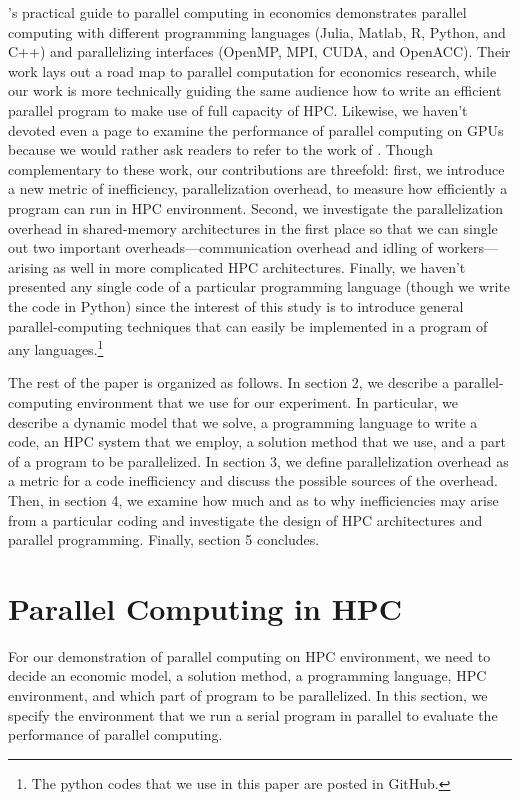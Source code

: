 \documentclass[12pt]{article}
\begin{document}
\cite{Fernandez-Villaverde-Valencia-18}'s practical guide to parallel computing in economics demonstrates parallel computing with different programming languages (Julia, Matlab, R, Python, and C++) and parallelizing interfaces (OpenMP, MPI, CUDA, and OpenACC). Their work lays out a road map to parallel computation for economics research, while our work is more technically guiding the same audience how to write an efficient parallel program to make use of full capacity of HPC. Likewise, we haven't devoted even a page to examine the performance of parallel computing on GPUs because we would rather ask readers to refer to the work of \cite{Aldrich-Fernandez-Villaverde-Gallant-Rubio-Ramirez-11}. Though complementary to these work, our contributions are threefold: first, we introduce a new metric of inefficiency, parallelization overhead, to measure how efficiently a program can run in HPC environment. Second, we investigate the parallelization overhead in shared-memory architectures in the first place so that we can single out two important overheads---communication overhead and idling of workers---arising as well in more complicated HPC architectures. Finally, we haven't presented any single code of a particular programming language (though we write the code in Python) since the interest of this study is to introduce general parallel-computing techniques that can easily be implemented in a program of any languages.\footnote{\sf The python codes that we use in this paper are posted in GitHub.}


The rest of the paper is organized as follows. In section 2, we describe a parallel-computing environment that we use for our experiment. In particular, we describe a dynamic model that we solve, a programming language to write a code, an HPC system that we employ, a solution method that we use, and a part of a program to be parallelized. In section 3, we define parallelization overhead as a metric for a code inefficiency and discuss the possible sources of the overhead. Then, in section 4, we examine how much and as to why inefficiencies may arise from a particular coding and investigate the design of HPC architectures and parallel programming. Finally, section 5 concludes.



\section{Parallel Computing in HPC}
For our demonstration of parallel computing on HPC environment, we need to decide an economic model, a solution method, a programming language, HPC environment, and which part of program to be parallelized. In this section, we specify the environment that we run a serial program in parallel to evaluate the performance of parallel computing.
\end{document}

